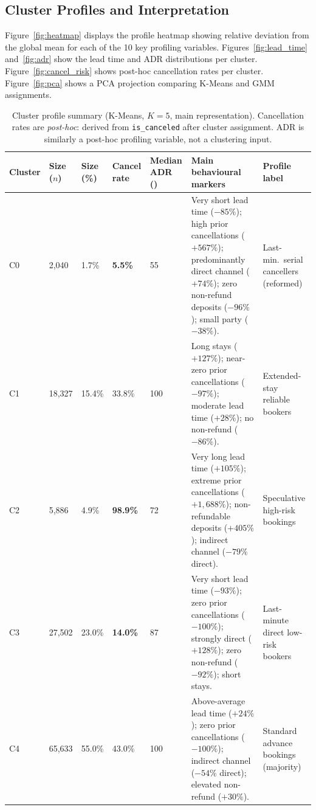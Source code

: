\documentclass[12pt,a4paper]{article}
\begin{document}
\subsection{Cluster Profiles and Interpretation}
\label{sec:profiles}

Figure~\ref{fig:heatmap} displays the profile heatmap showing relative
deviation from the global mean for each of the 10 key profiling variables.
Figures~\ref{fig:lead_time} and~\ref{fig:adr} show the lead time and ADR
distributions per cluster.
Figure~\ref{fig:cancel_risk} shows post-hoc cancellation rates per cluster.
Figure~\ref{fig:pca} shows a PCA projection comparing K-Means and GMM
assignments.

\begin{table}[H]
  \centering
  \caption{Cluster profile summary (K-Means, $K=5$, main representation).
           Cancellation rates are \emph{post-hoc}: derived from
           \texttt{is\_canceled} after cluster assignment. ADR is
           similarly a post-hoc profiling variable, not a clustering input.}
  \label{tab:cluster_profiles}
  \footnotesize
  \setlength{\tabcolsep}{3pt}
  \begin{tabular}{@{}C{0.9cm}C{1.4cm}C{1.4cm}C{1.5cm}C{1.4cm}L{5.5cm}L{2.2cm}@{}}
    \toprule
    Cluster & Size ($n$) & Size (\%) & Cancel rate & Median ADR (\EUR{}) & Main behavioural markers & Profile label \\
    \midrule
    C0 & 2,040   & 1.7\%  & \textbf{5.5\%}  & 55
       & Very short lead time ($-85\%$); high prior cancellations ($+567\%$); predominantly direct channel ($+74\%$); zero non-refund deposits ($-96\%$); small party ($-38\%$).
       & Last-min.\ serial cancellers (reformed) \\[4pt]
    C1 & 18,327  & 15.4\% & 33.8\%          & 100
       & Long stays ($+127\%$); near-zero prior cancellations ($-97\%$); moderate lead time ($+28\%$); no non-refund ($-86\%$).
       & Extended-stay reliable bookers \\[4pt]
    C2 & 5,886   & 4.9\%  & \textbf{98.9\%} & 72
       & Very long lead time ($+105\%$); extreme prior cancellations ($+1{,}688\%$); non-refundable deposits ($+405\%$); indirect channel ($-79\%$ direct).
       & Speculative high-risk bookings \\[4pt]
    C3 & 27,502  & 23.0\% & \textbf{14.0\%} & 87
       & Very short lead time ($-93\%$); zero prior cancellations ($-100\%$); strongly direct ($+128\%$); zero non-refund ($-92\%$); short stays.
       & Last-minute direct low-risk bookers \\[4pt]
    C4 & 65,633  & 55.0\% & 43.0\%          & 100
       & Above-average lead time ($+24\%$); zero prior cancellations ($-100\%$); indirect channel ($-54\%$ direct); elevated non-refund ($+30\%$).
       & Standard advance bookings (majority) \\
    \bottomrule
  \end{tabular}
\end{table}
\end{document}
